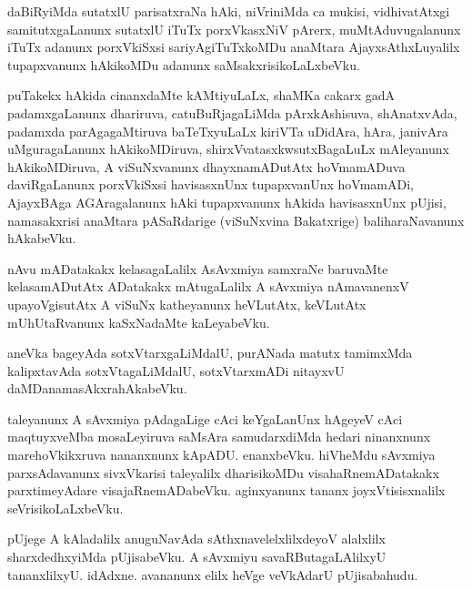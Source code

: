 \documentclass{article}
\begin{document}
\begin{mn}%
daBiRyiMda sutatxlU parisatxraNa hAki, niVriniMda ca mukisi, vidhivatAtxgi 
samitutxgaLanunx sutatxlU iTuTx porxVkasxNiV pArerx, muMtAduvugalanunx iTuTx adanunx 
porxVkiSxsi sariyAgiTuTxkoMDu anaMtara AjayxsAthxLuyalilx tupapxvanunx hAkikoMDu adanunx 
saMsakxrisikoLaLxbeVku.
\end{mn}

\begin{mn}%
puTakekx hAkida cinanxdaMte kAMtiyuLaLx, shaMKa cakarx gadA padamxgaLanunx dhariruva, 
catuBuRjagaLiMda pArxkAshisuva, shAnatxvAda, padamxda parAgagaMtiruva baTeTxyuLaLx 
kiriVTa uDidAra, hAra, janivAra uMguragaLanunx hAkikoMDiruva, shirxVvatasxkwsutxBagaLuLx 
mAleyanunx hAkikoMDiruva, A viSuNxvanunx dhayxnamADutAtx hoVmamADuva daviRgaLanunx 
porxVkiSxsi havisasxnUnx tupapxvanUnx hoVmamADi, AjayxBAga AGAragalanunx hAki 
tupapxvanunx hAkida havisasxnUnx pUjisi, namasakxrisi anaMtara pASaRdarige (viSuNxvina 
Bakatxrige) baliharaNavanunx hAkabeVku.
\end{mn}

\begin{mn}%
nAvu mADatakakx kelasagaLalilx AsAvxmiya samxraNe baruvaMte kelasamADutAtx ADatakakx 
mAtugaLalilx A sAvxmiya nAmavanenxV upayoVgisutAtx A viSuNx katheyanunx heVLutAtx, 
keVLutAtx mUhUtaRvanunx kaSxNadaMte kaLeyabeVku.
\end{mn}

\begin{mn}%
aneVka bageyAda sotxVtarxgaLiMdalU, purANada matutx tamimxMda kalipxtavAda 
sotxVtagaLiMdalU, sotxVtarxmADi nitayxvU daMDanamasAkxrahAkabeVku.
\end{mn}

\begin{mn}%
taleyanunx A sAvxmiya pAdagaLige cAci keYgaLanUnx hAgeyeV cAci maqtuyxveMba mosaLeyiruva 
saMsAra samudarxdiMda hedari ninanxnunx marehoVkikxruva nananxnunx kApADU. enanxbeVku. 
hiVheMdu sAvxmiya parxsAdavanunx sivxVkarisi taleyalilx dharisikoMDu visahaRnemADatakakx 
parxtimeyAdare visajaRnemADabeVku. aginxyanunx tananx joyxVtisisxnalilx seVrisikoLaLxbeVku.
\end{mn}

\begin{mn}%
pUjege A kAladalilx anuguNavAda sAthxnavelelxlilxdeyoV alalxlilx sharxdedhxyiMda 
pUjisabeVku. A sAvxmiyu savaRButagaLAlilxyU tananxlilxyU. idAdxne. avananunx elilx heVge 
veVkAdarU pUjisabahudu.
\end{mn}
\end{document}
